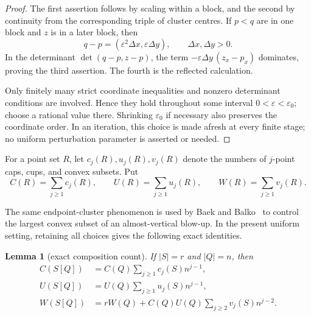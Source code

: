 \documentclass[11pt]{article}
\newtheorem{lemma}[theorem]{Lemma}
\theoremstyle{remark}
\begin{document}
\begin{proof}
The first assertion follows by scaling within a block, and the second by
continuity from the corresponding triple of cluster centres.  If $p<q$
are in one block and $z$ is in a later block, then
\[
 q-p=(\varepsilon^2\Delta x,\varepsilon\Delta y),
 \qquad \Delta x,\Delta y>0.
\]
In the determinant $\det(q-p,z-p)$, the term
$-\varepsilon\Delta y\,(z_x-p_x)$ dominates, proving the third assertion.
The fourth is the reflected calculation.

Only finitely many strict coordinate inequalities and nonzero determinant
conditions are involved.  Hence they hold throughout some interval
$0<\varepsilon<\varepsilon_0$; choose a rational value there.  Shrinking
$\varepsilon_0$ if necessary also preserves the coordinate order.
In an iteration, this choice is made afresh at every finite stage; no
uniform perturbation parameter is asserted or needed.
\end{proof}

For a point set $R$, let $c_j(R),u_j(R),v_j(R)$ denote the numbers of
$j$-point caps, cups, and convex subsets.  Put
\[
 C(R)=\sum_{j\ge1}c_j(R),\qquad
 U(R)=\sum_{j\ge1}u_j(R),\qquad
 W(R)=\sum_{j\ge1}v_j(R).                         \tag{2.2}
\]

The same endpoint-cluster phenomenon is used by Baek and
Balko~\cite[Lemma~14]{BaekBalko2026} to control the largest convex subset of
an almost-vertical blow-up.  In the present uniform setting, retaining all
choices gives the following exact identities.

\begin{lemma}[exact composition count]\label{lem:composition}
If $|S|=r$ and $|Q|=n$, then
\begin{align}
 C(S[Q])&=C(Q)\sum_{j\ge1}c_j(S)n^{j-1},\tag{2.3}\label{eq:Ccomp}\\
 U(S[Q])&=U(Q)\sum_{j\ge1}u_j(S)n^{j-1},\tag{2.4}\label{eq:Ucomp}\\
 W(S[Q])&=rW(Q)+C(Q)U(Q)
                 \sum_{j\ge2}v_j(S)n^{j-2}.\tag{2.5}\label{eq:Wcomp}
\end{align}
\end{lemma}
\end{document}
